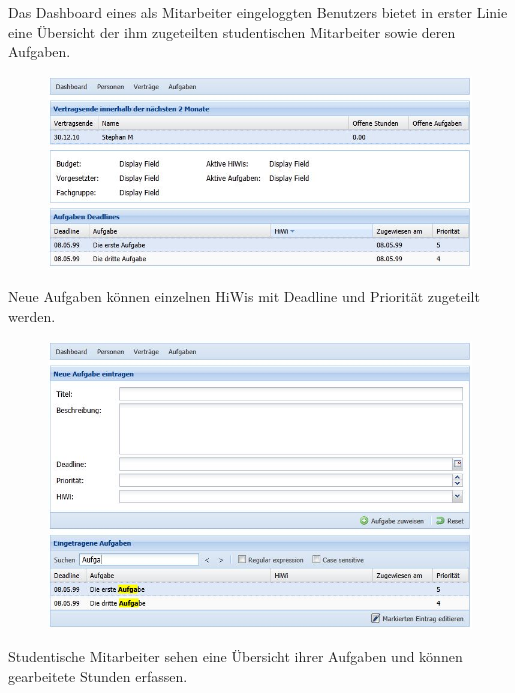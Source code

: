 \documentclass[article,colorback,accentcolor=tud2c]{tudreport}
\begin{document}
Das Dashboard eines als Mitarbeiter eingeloggten Benutzers bietet in erster Linie eine Übersicht der ihm zugeteilten studentischen Mitarbeiter sowie deren Aufgaben.

\begin{figure}[h]
    \begin{center}
        \includegraphics[scale=0.8]{img/mitarbeiter-dashboard}
    \end{center}
\end{figure}

\newpage

Neue Aufgaben können einzelnen HiWis mit Deadline und Priorität zugeteilt werden.

\begin{figure}[h]
    \begin{center}
        \includegraphics[scale=0.7]{img/mitarbeiter-aufgaben}
    \end{center}
\end{figure}

Studentische Mitarbeiter sehen eine Übersicht ihrer Aufgaben und können gearbeitete Stunden erfassen.
\end{document}
